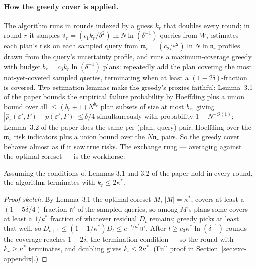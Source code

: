 \paragraph{How the greedy cover is applied.}
The algorithm runs in rounds indexed by a guess $k_r$ that doubles every round; in
round $r$ it samples $\mathfrak{n}_r = (c_1 k_r/\delta^{2})\ln N\ln(\delta^{-1})$
queries from $W$, estimates each plan's risk on each sampled query from
$\mathfrak{m}_r = (c_2/\varepsilon^{2})\ln N\ln\mathfrak{n}_r$ profiles drawn from the
query's uncertainty profile, and runs a maximum-coverage greedy with budget
$b_r = c_3 k_r\ln(\delta^{-1})$ plans: repeatedly add the plan covering the most
not-yet-covered sampled queries, terminating when at least a $(1-2\delta)$-fraction is
covered. Two estimation lemmas make the greedy's proxies faithful: Lemma~3.1 of the
paper bounds the empirical failure probability by Hoeffding plus a union bound over
all $\le (b_r+1)N^{b_r}$ plan subsets of size at most $b_r$, giving
$|\widehat{p}_r(\varepsilon',F) - p(\varepsilon',F)|\le\delta/4$ simultaneously with
probability $1-N^{-O(1)}$; Lemma~3.2 of the paper does the same per (plan, query)
pair, Hoeffding over the $\mathfrak{m}_r$ risk indicators plus a union bound over the
$N\mathfrak{n}_r$ pairs. So the greedy cover behaves almost as if it saw true risks.
The exchange rung --- averaging against the optimal coreset --- is the workhorse:

\begin{lemma}\label{lem:exc-053-term}
Assuming the conditions of Lemmas 3.1 and 3.2 of the paper hold in every round, the
algorithm terminates with $k_r \le 2\kappa^{*}$. \eop
\end{lemma}

\begin{proof}[Proof sketch]
By Lemma~3.1 the optimal coreset $M$, $|M| = \kappa^{*}$, covers at least a
$(1-5\delta/4)$-fraction $\mathfrak{n}'$ of the sampled queries, so among $M$'s plans
some covers at least a $1/\kappa^{*}$ fraction of whatever residual $D_t$ remains;
greedy picks at least that well, so $D_{t+1}\le(1-1/\kappa^{*})D_t \le
e^{-t/\kappa^{*}}\mathfrak{n}'$. After $t \ge c_3\kappa^{*}\ln(\delta^{-1})$ rounds
the coverage reaches $1-2\delta$, the termination condition --- so the round with
$k_r\ge\kappa^{*}$ terminates, and doubling gives $k_r\le 2\kappa^{*}$. (Full proof in
Section~\ref{sec:exc-appendix}.)
\end{proof}


